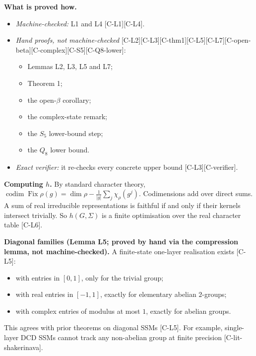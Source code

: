 \documentclass[10pt,twocolumn,a4paper]{article}
\providecommand{\tightlist}{\setlength{\itemsep}{0pt}\setlength{\parskip}{0pt}}
\begin{document}
\textbf{What is proved how.}

\begin{itemize}
\tightlist
\item
  \emph{Machine-checked:} L1 and L4 {[}C-L1{]}{[}C-L4{]}.
\item
  \emph{Hand proofs, not machine-checked} {[}C-L2{]}{[}C-L3{]}{[}C-thm1{]}{[}C-L5{]}{[}C-L7{]}{[}C-open-beta{]}{[}C-complex{]}{[}C-S5{]}{[}C-Q8-lower{]}:

  \begin{itemize}
  \tightlist
  \item
    Lemmas L2, L3, L5 and L7;
  \item
    Theorem 1;
  \item
    the open-\(\beta\) corollary;
  \item
    the complex-state remark;
  \item
    the \(S_5\) lower-bound step;
  \item
    the \(Q_8\) lower bound.
  \end{itemize}
\item
  \emph{Exact verifier:} it re-checks every concrete upper bound {[}C-L3{]}{[}C-verifier{]}.
\end{itemize}

\textbf{Computing \(h\).} By standard character theory, \(\operatorname{codim}\operatorname{Fix}\rho(g) = \dim\rho - \frac{1}{|g|}\sum_j \chi_\rho(g^j)\). Codimensions add over direct sums. A sum of real irreducible representations is faithful if and only if their kernels intersect trivially. So \(h(G,\Sigma)\) is a finite optimisation over the real character table {[}C-L6{]}.

\textbf{Diagonal families (Lemma L5; proved by hand via the compression lemma, not machine-checked).} A finite-state one-layer realisation exists {[}C-L5{]}:

\begin{itemize}
\tightlist
\item
  with entries in \([0,1]\), only for the trivial group;
\item
  with real entries in \([-1,1]\), exactly for elementary abelian \(2\)-groups;
\item
  with complex entries of modulus at most \(1\), exactly for abelian groups.
\end{itemize}

This agrees with prior theorems on diagonal SSMs {[}C-L5{]}. For example, single-layer DCD SSMs cannot track any non-abelian group at finite precision {[}C-lit-shakerinava{]}.
\end{document}
